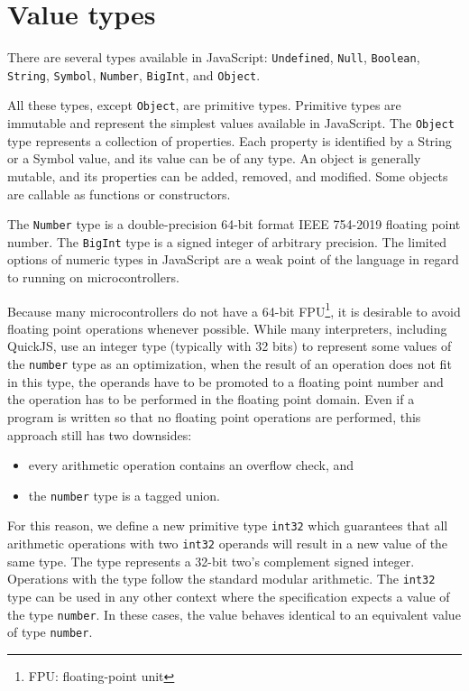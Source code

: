 \section{Value types}\label{lang:types}

There are several types available in JavaScript: \texttt{Undefined}, \texttt{Null}, \texttt{Boolean}, \texttt{String}, \texttt{Symbol}, \texttt{Number}, \texttt{BigInt}, and \texttt{Object}.

All these types, except \texttt{Object}, are primitive types. Primitive types are immutable and represent the simplest values available in JavaScript. The \texttt{Object} type represents a collection of properties. Each property is identified by a String or a Symbol value, and its value can be of any type. An object is generally mutable, and its properties can be added, removed, and modified. Some objects are callable as functions or constructors.

The \texttt{Number} type is a double-precision 64-bit format IEEE 754-2019\cite{ieee754} floating point number. The \texttt{BigInt} type is a signed integer of arbitrary precision. The limited options of numeric types in JavaScript are a weak point of the language in regard to running on microcontrollers.

Because many microcontrollers do not have a 64-bit FPU\footnote{FPU: floating-point unit}, it is desirable to avoid floating point operations whenever possible. While many interpreters, including QuickJS, use an integer type (typically with 32 bits) to represent some values of the \texttt{number} type as an optimization, when the result of an operation does not fit in this type, the operands have to be promoted to a floating point number and the operation has to be performed in the floating point domain. Even if a program is written so that no floating point operations are performed, this approach still has two downsides:
\begin{itemize}
    \item every arithmetic operation contains an overflow check, and
    \item the \texttt{number} type is a tagged union.
\end{itemize}

For this reason, we define a new primitive type \texttt{int32} which guarantees that all arithmetic operations with two \texttt{int32} operands will result in a new value of the same type. The type represents a 32-bit two's complement signed integer. Operations with the type follow the standard modular arithmetic. The \texttt{int32} type can be used in any other context where the specification expects a value of the type \texttt{number}. In these cases, the value behaves identical to an equivalent value of type \texttt{number}.

